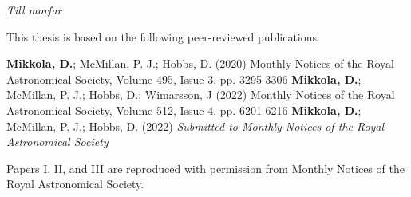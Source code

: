 \documentclass[E5,LUFonts]{lundphdthesis}
\begin{document}
\newpage

\vspace*{140pt}
\begin{flushright}
\textit{Till morfar}
\end{flushright}

\cleardoublepage
\frontmatter
\pagestyle{plain}
\setcounter{page}{1} %
\setcounter{tocdepth}{1}
\setcounter{secnumdepth}{2}
\renewcommand{\thesection}{\arabic{section}}
\tableofcontents


\newpage
{}

This thesis is based on the following peer-reviewed publications:
\vspace{1mm}

{\textbf{Mikkola, D.}; McMillan, P. J.; Hobbs, D. (2020)}
{Monthly Notices of the Royal Astronomical Society, Volume 495, Issue 3, pp. 3295-3306}
{\textbf{Mikkola, D.}; McMillan, P. J.; Hobbs, D.; Wimarsson, J (2022)}
{Monthly Notices of the Royal Astronomical Society, Volume 512, Issue 4, pp. 6201-6216}
{\textbf{Mikkola, D.}; McMillan, P. J.; Hobbs, D. (2022)}
{\textit{Submitted to Monthly Notices of the Royal Astronomical Society}}%
\makephdarticletable


\noindent Papers I, II, and III  are reproduced with permission from Monthly Notices of the Royal Astronomical Society.

\newpage

\end{document}
